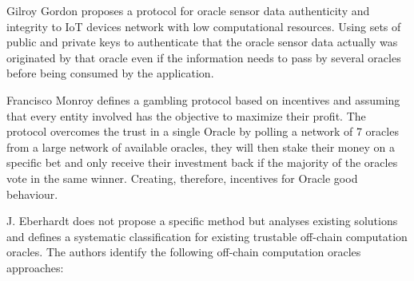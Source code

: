 Gilroy Gordon \citet{Gordon2017} proposes a protocol for oracle sensor data authenticity and integrity to IoT devices network with low computational resources. Using sets of public and private keys to authenticate that the oracle sensor data actually was originated by that oracle even if the information needs to pass by several oracles before being consumed by the application.

Francisco Monroy \citet{MontotoMonroy2018} defines a gambling protocol based on incentives and assuming that every entity involved has the objective to maximize their profit. The protocol overcomes the trust in a single Oracle by polling a network of 7 oracles from a large network of available oracles, they will then stake their money on a specific bet and only receive their investment back if the majority of the oracles vote in the same winner. Creating, therefore, incentives for Oracle good behaviour.


J. Eberhardt \citet{Eberhardt2018} does not propose a specific method but analyses existing solutions and defines a systematic classification for existing trustable off-chain computation oracles. The authors identify the following off-chain computation oracles approaches:




